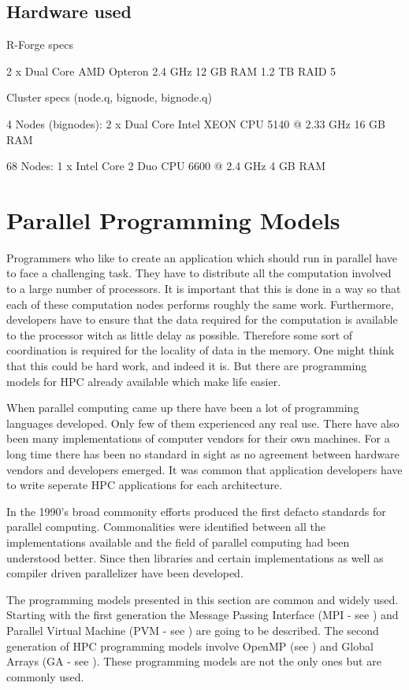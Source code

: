 \subsection{Hardware used}

R-Forge specs

2 x Dual Core AMD Opteron 2.4 GHz
12 GB RAM
1.2 TB RAID 5

Cluster specs (node.q, bignode, bignode.q)

4 Nodes (bignodes):
2 x Dual Core Intel XEON CPU 5140 @ 2.33 GHz
16 GB RAM

68 Nodes:
1 x Intel Core 2 Duo CPU 6600 @ 2.4 GHz
4 GB RAM




\section{Parallel Programming Models}
\label{sec:programming_models}

Programmers who like to create an application which should run in
parallel have to face a challenging task. They have to distribute all
the computation involved to a large number of processors. It is
important that this is done in a way so that each of these computation
nodes performs roughly the same work. Furthermore, developers have to
ensure that the data required for the computation is available to the
processor witch as little delay as possible. Therefore some sort of
coordination is required for the locality of data in the memory.
One might think that this could be hard work, and indeed it is. But
there are programming models for HPC already available which make life
easier.

When parallel computing came up there have been a lot of programming
languages developed. Only few of them experienced any real use. There
have also been many implementations of computer vendors for their own
machines. For a long time there has been no standard in sight as no
agreement between hardware vendors and developers emerged. It was
common that application developers have to write seperate HPC
applications for each architecture.

In the 1990's broad commonity efforts produced the first defacto
standards for parallel computing. Commonalities were identified
between all the implementations available and the field of parallel
computing had been understood better. Since then libraries and certain
implementations as well as compiler driven parallelizer have been
developed.

The programming models presented in this section are common and widely
used. Starting with the first generation the Message Passing Interface
(MPI - see \cite{forum94:MPI}) and Parallel Virtual Machine (PVM - see
\cite{geist94pvm})
are going to be described. The second generation of HPC programming
models involve OpenMP (see \cite{openMP05}) and Global Arrays (GA - see
\cite{nieplocha96gan}). These programming models are not the only ones
but are commonly used. 

